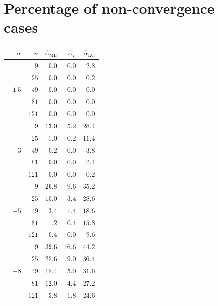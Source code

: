 \documentclass[10pt,a4paper]{article}
\begin{document}
\vspace{0.5cm}

\section{Percentage of non-convergence cases }

\vspace{0.5cm}

\begin{minipage}{0.5\linewidth}
\begin{tabular}{rrrrr}
	\toprule
	$\alpha$ & $n$ & $\widehat{\alpha}_{\text{ML}}$ & $\widehat{\alpha}_{\Gamma}$ & $\widehat{\alpha}_{\text{LC}}$\\  
	\midrule
	\multirow{5 }{*}{$-1.5$}
	& $9$   & $0.0$ & $0.0$ & $2.8$ \\ 
	& $25$  & $0.0$ & $0.0$ & $0.2$ \\ 
	& $49$  & $0.0$ & $0.0$ & $0.0$ \\ 
	& $81$  & $0.0$ & $0.0$ & $0.0$ \\ 
	& $121$ & $0.0$ & $0.0$ & $0.0$ \\  
	\midrule
	\multirow{5 }{*}{$-3$}
	& $9$   & $13.0$ & $5.2$ & $28.4$ \\ 
	& $25$  & $1.0$  & $0.2$ & $11.4$ \\ 
	& $49$  & $0.2$  & $0.0$ & $3.8$  \\ 
	& $81$  & $0.0$  & $0.0$ & $2.4$  \\ 
	& $121$ & $0.0$  & $0.0$ & $0.2$  \\    
	\midrule
	\multirow{5 }{*}{$-5$}
	& $9$   & $26.8$ & $9.6$ & $35.2$ \\ 
	& $25$  & $10.0$ & $3.4$ & $28.6$ \\ 
	& $49$  & $3.4$  & $1.4$ & $18.6$ \\ 
	& $81$  & $1.2$  & $0.4$ & $15.8$ \\ 
	& $121$ & $0.4$  & $0.0$ & $9.6$  \\   
	\midrule
	\multirow{5 }{*}{$-8$}
	& $9$   & $39.6$ & $16.6$ & $44.2$ \\ 
	& $25$  & $28.6$ & $9.0$  & $36.4$ \\ 
	& $49$  & $18.4$ & $5.0$  & $31.6$ \\ 
	& $81$  & $12.0$ & $4.4$  & $27.2$ \\ 
	& $121$ & $5.8$  & $1.8$  & $24.6$ \\ 
	\bottomrule
\end{tabular}
\end{minipage}
\end{document}
